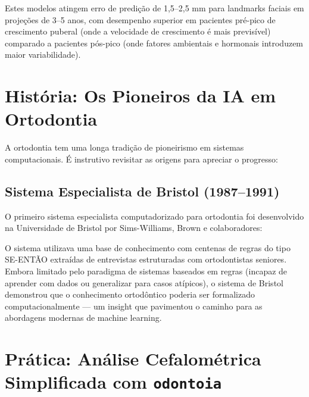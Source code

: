 Estes modelos atingem erro de predição de 1,5--2,5 mm para landmarks faciais em projeções de 3--5 anos, com desempenho superior em pacientes pré-pico de crescimento puberal (onde a velocidade de crescimento é mais previsível) comparado a pacientes pós-pico (onde fatores ambientais e hormonais introduzem maior variabilidade).

\section{História: Os Pioneiros da IA em Ortodontia}

A ortodontia tem uma longa tradição de pioneirismo em sistemas computacionais. É instrutivo revisitar as origens para apreciar o progresso:

\subsection{Sistema Especialista de Bristol (1987--1991)}

O primeiro sistema especialista computadorizado para ortodontia foi desenvolvido na Universidade de Bristol por Sims-Williams, Brown e colaboradores:


O sistema utilizava uma base de conhecimento com centenas de regras do tipo SE-ENTÃO extraídas de entrevistas estruturadas com ortodontistas seniores. Embora limitado pelo paradigma de sistemas baseados em regras (incapaz de aprender com dados ou generalizar para casos atípicos), o sistema de Bristol demonstrou que o conhecimento ortodôntico poderia ser formalizado computacionalmente --- um insight que pavimentou o caminho para as abordagens modernas de machine learning.

\section{Prática: Análise Cefalométrica Simplificada com \texttt{odontoia}}

